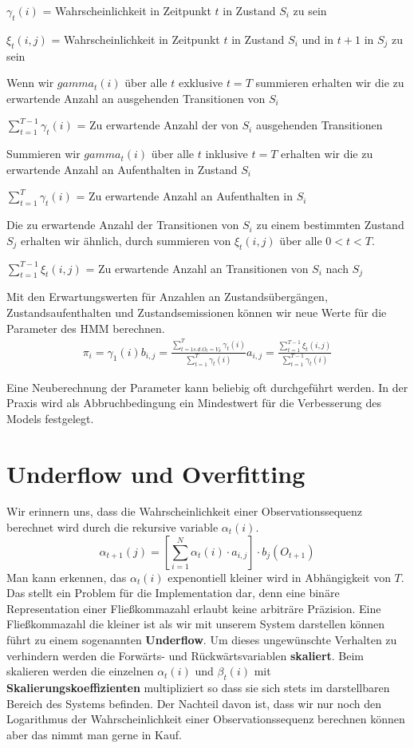 $\gamma_t(i)$ = Wahrscheinlichkeit in Zeitpunkt $t$ in Zustand $S_i$ zu sein

$\xi_t(i, j)$ = Wahrscheinlichkeit in Zeitpunkt $t$ in Zustand $S_i$ und in $t+1$ in $S_j$ zu sein

Wenn wir $gamma_t(i)$ über alle $t$ exklusive $t=T$ summieren erhalten wir die zu erwartende Anzahl an ausgehenden Transitionen von $S_i$

$\sum_{t=1}^{T-1} \gamma_t(i)$ = Zu erwartende Anzahl der von $S_i$ ausgehenden Transitionen

Summieren wir $gamma_t(i)$ über alle $t$ inklusive $t=T$ erhalten wir die zu erwartende Anzahl an Aufenthalten in
Zustand $S_i$

$\sum_{t=1}^{T} \gamma_t(i)$ = Zu erwartende Anzahl an Aufenthalten in $S_i$

Die zu erwartende Anzahl der Transitionen von $S_i$ zu einem bestimmten Zustand $S_j$ erhalten 
wir ähnlich, durch summieren von $\xi_t(i, j)$ über alle $0 < t < T$.

$\sum_{t=1}^{T-1} \xi_t(i, j)$ = Zu erwartende Anzahl an Transitionen von $S_i$ nach $S_j$

Mit den Erwartungswerten für Anzahlen an Zustandsübergängen, Zustandsaufenthalten und Zustandsemissionen können wir neue Werte für die Parameter des HMM berechnen.
\begin{align*}
\pi_i = \gamma_1(i)
b_{i,j} = \frac{\sum_{t=1 s.d. O_t= V_k}^{T} \gamma_t(i)}{\sum_{t=1}^{T} \gamma_t(i)}
a_{i,j} = \frac{\sum_{t=1}^{T-1} \xi_t(i, j)}{\sum_{t=1}^{T-1} \gamma_t(i)}
\end{align*}

Eine Neuberechnung der Parameter kann beliebig oft durchgeführt werden.
In der Praxis wird als Abbruchbedingung ein Mindestwert für die Verbesserung des Models festgelegt.

\section*{Underflow und Overfitting}
Wir erinnern uns, dass die Wahrscheinlichkeit einer Observationssequenz berechnet wird durch die rekursive variable $\alpha_t(i)$.
\begin{equation*}
    \alpha_{t+1}(j) = \left[ \sum_{i=1}^{N} \alpha_t(i) \cdot a_{i,j} \right] \cdot b_j(O_{t+1})
\end{equation*}
Man kann erkennen, das $\alpha_t(i)$ expenontiell kleiner wird in Abhängigkeit von $T$. Das stellt ein Problem für die Implementation dar, denn eine binäre Representation einer Fließkommazahl erlaubt keine arbiträre Präzision. Eine Fließkommazahl die kleiner ist als wir mit unserem System darstellen können führt zu einem sogenannten \textbf{Underflow}. Um dieses ungewünschte Verhalten zu verhindern werden die Forwärts- und Rückwärtsvariablen \textbf{skaliert}. Beim skalieren werden die einzelnen $\alpha_t(i)$ und $\beta_t(i)$ mit \textbf{Skalierungskoeffizienten} multipliziert so dass sie sich stets im darstellbaren Bereich des Systems befinden. Der Nachteil davon ist, dass wir nur noch den Logarithmus der Wahrscheinlichkeit einer Observationssequenz berechnen können aber das nimmt man gerne in Kauf.

